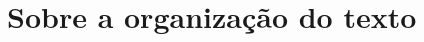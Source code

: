 \documentclass[]{politex}
\begin{document}









\section{Sobre a organização do texto}\label{organizacao}
\end{document}
